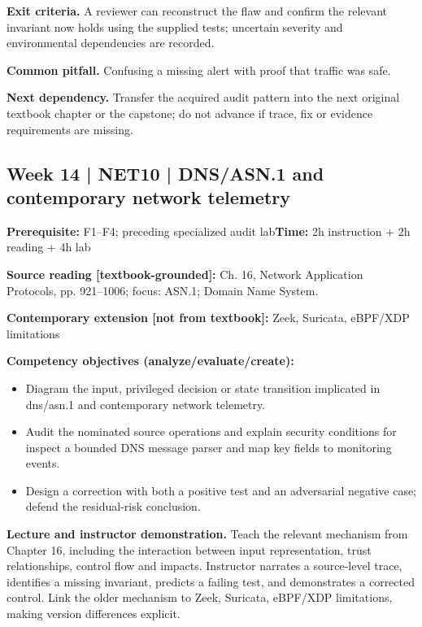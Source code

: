 \documentclass[10pt,letterpaper]{article}
\begin{document}
\textbf{Exit criteria.} A reviewer can reconstruct the flaw and confirm the relevant invariant now holds using the supplied tests; uncertain severity and environmental dependencies are recorded.

\textbf{Common pitfall.} Confusing a missing alert with proof that traffic was safe.

\textbf{Next dependency.} Transfer the acquired audit pattern into the next original textbook chapter or the capstone; do not advance if trace, fix or evidence requirements are missing.

\subsection{Week 14 | NET10 | DNS/ASN.1 and contemporary network telemetry}
\textbf{Prerequisite:} F1--F4; preceding specialized audit lab\hfill\textbf{Time:} 2h instruction + 2h reading + 4h lab

\textbf{Source reading [textbook-grounded]:} Ch. 16, Network Application Protocols, pp. 921--1006; focus: ASN.1; Domain Name System.

\textbf{Contemporary extension [not from textbook]:} Zeek, Suricata, eBPF/XDP limitations

\textbf{Competency objectives (analyze/evaluate/create):}
\begin{itemize}[leftmargin=*,itemsep=2pt]
\item Diagram the input, privileged decision or state transition implicated in dns/asn.1 and contemporary network telemetry.
\item Audit the nominated source operations and explain security conditions for inspect a bounded DNS message parser and map key fields to monitoring events.
\item Design a correction with both a positive test and an adversarial negative case; defend the residual-risk conclusion.
\end{itemize}
\textbf{Lecture and instructor demonstration.} Teach the relevant mechanism from Chapter 16, including the interaction between input representation, trust relationships, control flow and impacts. Instructor narrates a source-level trace, identifies a missing invariant, predicts a failing test, and demonstrates a corrected control. Link the older mechanism to Zeek, Suricata, eBPF/XDP limitations, making version differences explicit.
\end{document}
